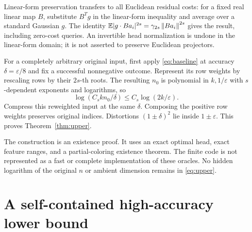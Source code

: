 \documentclass[11pt]{article}
\theoremstyle{remark}\newtheorem{remark}[theorem]{Remark}
\newcommand{\eps}{\varepsilon}\newcommand{\Sym}{\operatorname{Sym}}
\newcommand{\norm}[1]{\left\|#1\right\|}\newcommand{\ip}[2]{\left\langle #1,#2\right\rangle}
\begin{document}
Linear-form preservation transfers to all Euclidean residual costs: for a fixed real linear map $B$, substitute $B^Tg$ in the linear-form inequality and average over a standard Gaussian $g$. The identity $\E|g\cdot Ba_i|^{2s}=\gamma_{2s}\norm{Ba_i}^{2s}$ gives the result, including zero-cost queries. An invertible head normalization is undone in the linear-form domain; it is not asserted to preserve Euclidean projectors.

For a completely arbitrary original input, first apply \eqref{eq:baseline} at accuracy $\delta=\eps/8$ and fix a successful nonnegative outcome. Represent its row weights by rescaling rows by their $2s$-th roots. The resulting $n_0$ is polynomial in $k,1/\eps$ with $s$-dependent exponents and logarithms, so
\[
 \log(C_skn_0/\delta)\le C_s\log(2k/\eps).
\]
Compress this reweighted input at the same $\delta$. Composing the positive row weights preserves original indices. Distortions $(1\pm\delta)^2$ lie inside $1\pm\eps$. This proves Theorem~\ref{thm:upper}.

The construction is an existence proof. It uses an exact optimal head, exact feature ranges, and a partial-coloring existence theorem. The finite code is not represented as a fast or complete implementation of these oracles. No hidden logarithm of the original $n$ or ambient dimension remains in \eqref{eq:upper}.

\section{A self-contained high-accuracy lower bound}\label{sec:lower}
\end{document}
